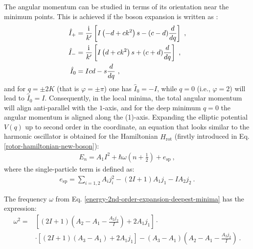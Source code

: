 The angular momentum can be studied in terms of its orientation near the minimum points. This is achieved if the boson expansion is written as \cite{raduta2020new}:
\begin{align}
    \hat{I}_+&=\frac{\iu}{k'}\left[I\left(-d+ck^2\right)s-(c-d)\frac{d}{dq}\right]\ ,\nonumber\\
    \hat{I}_-&=\frac{\iu}{k'}\left[I\left(d+ck^2\right)s+(c+d)\frac{d}{dq}\right]\ ,\nonumber\\
    \hat{I}_0&=Icd-s\frac{d}{dq}\ ,
\end{align}
and for $q=\pm2K$ (that is $\varphi=\pm\pi$) one has $\hat{I}_0=-I$, while $q=0$ (i.e., $\varphi=2$) will lead to $\hat{I}_0=I$. Consequently, in the local minima, the total angular momentum will align anti-parallel with the $1$-axis, and for the deep minimum $q=0$ the angular momentum is aligned along the (1)-axis. Expanding the elliptic potential $V(q)$ up to second order in the coordinate, an equation that looks similar to the harmonic oscillator is obtained for the Hamiltonian $\hat{H}_\text{rot}$ (firstly introduced in Eq. \ref{rotor-hamiltonian-new-boson}):
\begin{align}
    E_n=A_1I^2+\hbar\omega\left(n+\frac{1}{2}\right)+e_\text{sp}\ ,
    \label{energy-2nd-order-expansion-deepest-minima}
\end{align}
where the single-particle term is defined as:
\begin{align}
    e_\text{sp}=\sum_{i=1,2}A_ij_i^2-(2I+1)A_1j_1-IA_2j_2\ .
\end{align}

The frequency $\omega$ from Eq. \ref{energy-2nd-order-expansion-deepest-minima} has the expression:
\begin{align}
    \omega^2=&\left[(2I+1)\left(A_2-A_1-\frac{A_2j_2}{I}\right)+2A_1j_1\right]\cdot\nonumber\\
    &\cdot\left[(2I+1)(A_3-A_1)+2A_1j_1\right]-(A_3-A_1)\left(A_2-A_1-\frac{A_2j_2}{I}\right)\ .
    \label{omega-frequency-deepest-minima}
\end{align}

    
